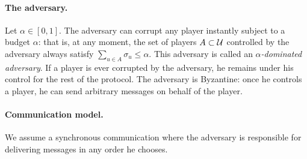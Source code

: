     \paragraph{The adversary.} 
    Let $\alpha \in [0,1]$. 
    The adversary can corrupt any player instantly subject to 
    a budget $\alpha$: that is, 
    at any moment, the set of players $A \subset \mathcal{U}$ controlled by the adversary 
    always satisfy $\sum_{u \in A} \sigma_u \leq \alpha$. 
    This adversary is called an \emph{$\alpha$-dominated adversary}. 
    If a player is ever corrupted by the adversary, 
    he remains under his control for the rest of the protocol. 
    The adversary is Byzantine: 
    once he controls a player, he can send arbitrary messages on behalf of the player.

    \paragraph{Communication model.} 
    We assume a synchronous communication where 
    the adversary is responsible for delivering messages in any order he chooses.

